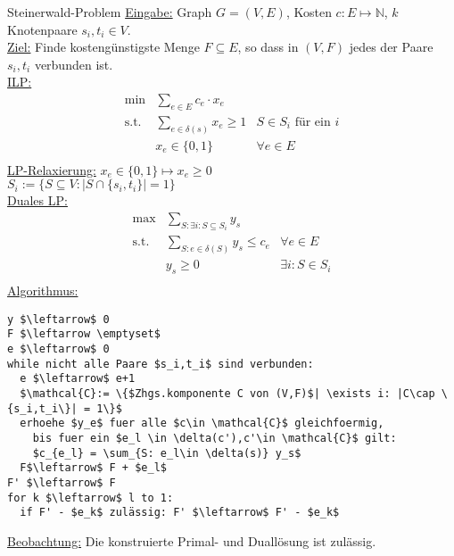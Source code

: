 \begin{section}{Steinerwald-Problem}
 \underline{Eingabe:} Graph $G=(V,E)$, Kosten $c: E \mapsto \mathbb{N}$, $k$ Knotenpaare $s_i,t_i \in V$.\\
 \underline{Ziel:} Finde kostengünstigste Menge $F\subseteq E$, so dass in $(V,F)$ jedes der Paare $s_i,t_i$ verbunden ist.\\
 \underline{ILP:} 
 \begin{align*} \min &\sum_{e \in E} c_e\cdot x_e\\
 \text{s.t. } &\sum_{e\in \delta(s)} x_e \geq 1 &S\in S_i \text{ für ein }i\\
 &x_e \in \{0,1\} &\forall e\in E\\
 \end{align*}
 \underline{LP-Relaxierung:} $x_e \in \{0,1\} \mapsto x_e \geq 0$\\
 $S_i := \{S\subseteq V: |S\cap \{s_i,t_i\}| = 1\}$\\
 \underline{Duales LP:} 
 \begin{align*}
  \max &\sum_{S: \exists i: S \subseteq S_i} y_s\\
  \text{s.t.} &\sum_{S: e\in \delta(S)} y_s\leq c_e &\forall e\in E\\
  &y_s \geq 0 &\exists i: S\in S_i\\                          
 \end{align*}
 \underline{Algorithmus:} 
 
 \begin{lstlisting}[mathescape]
y $\leftarrow$ 0
F $\leftarrow \emptyset$
e $\leftarrow$ 0
while nicht alle Paare $s_i,t_i$ sind verbunden:
  e $\leftarrow$ e+1
  $\mathcal{C}:= \{$Zhgs.komponente C von (V,F)$| \exists i: |C\cap \{s_i,t_i\}| = 1\}$
  erhoehe $y_e$ fuer alle $c\in \mathcal{C}$ gleichfoermig, 
    bis fuer ein $e_l \in \delta(c'),c'\in \mathcal{C}$ gilt: 
    $c_{e_l} = \sum_{S: e_l\in \delta(s)} y_s$
  F$\leftarrow$ F + $e_l$
F' $\leftarrow$ F
for k $\leftarrow$ l to 1:
  if F' - $e_k$ zulässig: F' $\leftarrow$ F' - $e_k$
 \end{lstlisting}
 \underline{Beobachtung:} Die konstruierte Primal- und Duallösung ist zulässig.
 

\end{section}
